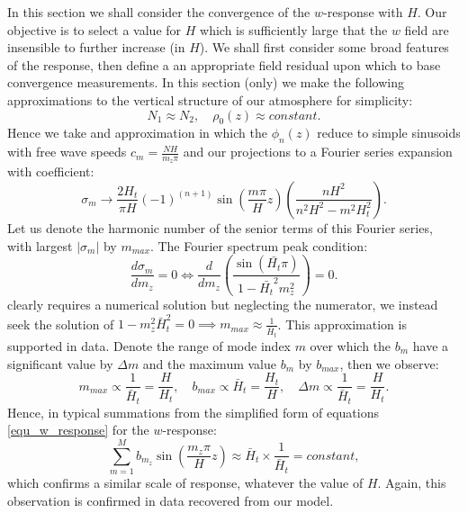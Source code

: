 \documentclass[a4paper,10pt]{article}
\begin{document}
In this section we shall consider the convergence of the $w$-response with $H$.
Our objective is to select a value for $H$ which is sufficiently large that the $w$ field are insensible to further 
increase (in $H$). We shall first consider some broad features of the response, then define
a an appropriate field residual upon which to base convergence measurements.  
In this section (only) we make the following approximations to the vertical structure of our 
atmosphere for simplicity:
%
\begin{equation}
N_1 \approx N_2, \quad \rho_0(z) \approx constant.
\end{equation}
%
Hence we take and approximation in which the $\phi_n(z)$ reduce to simple sinusoids with free wave speeds  $c_m = \frac{N H}{ m_z \pi}$ and our projections 
to a Fourier series expansion with coefficient:
%
\begin{equation}
\sigma_m \rightarrow \frac{2 H_t}{\pi H} (-1)^{(n+1)} \sin \left( \frac{m \pi }{H} z \right) \left( \frac{nH^2}{n^2 H^2 - m^2 H_t^2} \right).
\end{equation}
%
Let us denote the harmonic number of the senior terms of this Fourier series, 
with largest $|\sigma_{m}|$ by $m_{max}$. 
The Fourier spectrum peak condition:
%
\begin{equation}
 \frac{d \sigma_m}{dm_z } = 0 \iff \frac{d}{dm_z} \left(  \frac{\sin \left( \bar{H_t} \pi \right) }{ 1 - \bar{H_t}^2 m_z^2 } \right) = 0.
\end{equation}
%
clearly requires a numerical solution but neglecting the numerator, we instead seek the solution of $1 - m_z^2 \bar{H}_t^2 = 0 \implies m_{max} \approx \frac{1}{\bar{H}_t}$.
This approximation is supported in data. Denote the range of mode index  $m$ over which the $b_{m}$ have a significant value by $\Delta m$ and the maximum value $b_{m}$ by $b_{max}$, 
then we observe:
%
\begin{equation}
m_{max} \propto \frac{1}{\bar{H}_t} = \frac{H}{H_t} , \quad b_{max} \propto \bar{H}_t = \frac{H_t}{H}, \quad \Delta m \propto \frac{1}{\bar{H}_t } = \frac{H}{H_t}.
\end{equation}
%
Hence, in typical summations from the simplified form of equations \ref{equ_w_response} for the $w$-response:
% 
\begin{equation}
\sum_{m=1}^M  b_{m_z} \sin \left( \frac{ m_z \pi }{ H} z \right) \approx \bar{H}_t \times \frac{1}{\bar{H}_t} = constant, 
\end{equation}
%
which confirms a similar scale of response, whatever the value of $H$. Again, this observation is confirmed in data recovered from 
our model.
\end{document}
